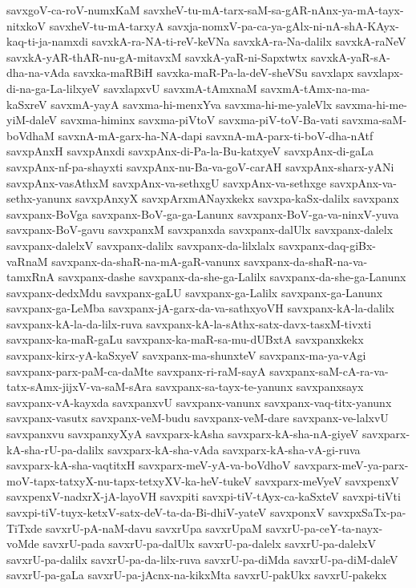 {savxgoV-ca-roV-numxKaM
savxheV-tu-mA-tarx-saM-sa-gAR-nAnx-ya-mA-tayx-nitxkoV
savxheV-tu-mA-tarxyA
savxja-nomxV-pa-ca-ya-gAlx-ni-nA-shA-KAyx-kaq-ti-ja-namxdi
savxkA-ra-NA-ti-reV-keVNa
savxkA-ra-Na-dalilx
savxkA-raNeV
savxkA-yAR-thAR-nu-gA-mitavxM
savxkA-yaR-ni-Sapxtwtx
savxkA-yaR-sA-dha-na-vAda
savxka-maRBiH
savxka-maR-Pa-la-deV-sheVSu
savxlapx
savxlapx-di-na-ga-La-lilxyeV
savxlapxvU
savxmA-tAmxnaM
savxmA-tAmx-na-ma-kaSxreV
savxmA-yayA
savxma-hi-menxYva
savxma-hi-me-yaleVlx
savxma-hi-me-yiM-daleV
savxma-himinx
savxma-piVtoV
savxma-piV-toV-Ba-vati
savxma-saM-boVdhaM
savxnA-mA-garx-ha-NA-dapi
savxnA-mA-parx-ti-boV-dha-nAtf
savxpAnxH
savxpAnxdi
savxpAnx-di-Pa-la-Bu-katxyeV
savxpAnx-di-gaLa
savxpAnx-nf-pa-shayxti
savxpAnx-nu-Ba-va-goV-carAH
savxpAnx-sharx-yANi
savxpAnx-vasAthxM
savxpAnx-va-sethxgU
savxpAnx-va-sethxge
savxpAnx-va-sethx-yanunx
savxpAnxyX
savxpArxmANayxkekx
savxpa-kaSx-dalilx
savxpanx
savxpanx-BoVga
savxpanx-BoV-ga-ga-Lanunx
savxpanx-BoV-ga-va-ninxV-yuva
savxpanx-BoV-gavu
savxpanxM
savxpanxda
savxpanx-dalUlx
savxpanx-dalelx
savxpanx-dalelxV
savxpanx-dalilx
savxpanx-da-lilxlalx
savxpanx-daq-giBx-vaRnaM
savxpanx-da-shaR-na-mA-gaR-vanunx
savxpanx-da-shaR-na-va-tamxRnA
savxpanx-dashe
savxpanx-da-she-ga-Lalilx
savxpanx-da-she-ga-Lanunx
savxpanx-dedxMdu
savxpanx-gaLU
savxpanx-ga-Lalilx
savxpanx-ga-Lanunx
savxpanx-ga-LeMba
savxpanx-jA-garx-da-va-sathxyoVH
savxpanx-kA-la-dalilx
savxpanx-kA-la-da-lilx-ruva
savxpanx-kA-la-sAthx-satx-davx-tasxM-tivxti
savxpanx-ka-maR-gaLu
savxpanx-ka-maR-sa-mu-dUBxtA
savxpanxkekx
savxpanx-kirx-yA-kaSxyeV
savxpanx-ma-shunxteV
savxpanx-ma-ya-vAgi
savxpanx-parx-paM-ca-daMte
savxpanx-ri-raM-sayA
savxpanx-saM-cA-ra-va-tatx-sAmx-jijxV-va-saM-sAra
savxpanx-sa-tayx-te-yanunx
savxpanxsayx
savxpanx-vA-kayxda
savxpanxvU
savxpanx-vanunx
savxpanx-vaq-titx-yanunx
savxpanx-vasutx
savxpanx-veM-budu
savxpanx-veM-dare
savxpanx-ve-lalxvU
savxpanxvu
savxpanxyXyA
savxparx-kAsha
savxparx-kA-sha-nA-giyeV
savxparx-kA-sha-rU-pa-dalilx
savxparx-kA-sha-vAda
savxparx-kA-sha-vA-gi-ruva
savxparx-kA-sha-vaqtitxH
savxparx-meV-yA-va-boVdhoV
savxparx-meV-ya-parx-moV-tapx-tatxyX-nu-tapx-tetxyXV-ka-heV-tukeV
savxparx-meVyeV
savxpenxV
savxpenxV-nadxrX-jA-layoVH
savxpiti
savxpi-tiV-tAyx-ca-kaSxteV
savxpi-tiVti
savxpi-tiV-tuyx-ketxV-satx-deV-ta-da-Bi-dhiV-yateV
savxponxV
savxpxSaTx-pa-TiTxde
savxrU-pA-naM-davu
savxrUpa
savxrUpaM
savxrU-pa-ceY-ta-nayx-voMde
savxrU-pada
savxrU-pa-dalUlx
savxrU-pa-dalelx
savxrU-pa-dalelxV
savxrU-pa-dalilx
savxrU-pa-da-lilx-ruva
savxrU-pa-diMda
savxrU-pa-diM-daleV
savxrU-pa-gaLa
savxrU-pa-jAcnx-na-kikxMta
savxrU-pakUkx
savxrU-pakekx
}
